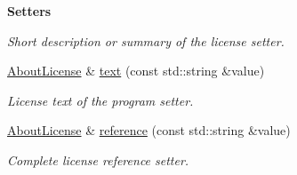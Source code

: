 \begin{Indent}{\bf Setters}
\begin{DoxyCompactItemize}
\begin{DoxyCompactList}\small\item\em Short description or summary of the license setter. \end{DoxyCompactList}\item 
\hyperlink{exceptionmagrathea_1_1AboutLicense}{About\-License} \& \hyperlink{exceptionmagrathea_1_1AboutLicense_a71eed42370a80b566ad1679ec188ad02}{text} (const std\-::string \&value)
\begin{DoxyCompactList}\small\item\em License text of the program setter. \end{DoxyCompactList}\item 
\hyperlink{exceptionmagrathea_1_1AboutLicense}{About\-License} \& \hyperlink{exceptionmagrathea_1_1AboutLicense_a1539d9523c37c9a5844278e99c18569a}{reference} (const std\-::string \&value)
\begin{DoxyCompactList}\small\item\em Complete license reference setter. \end{DoxyCompactList}\end{DoxyCompactItemize}
\end{Indent}
